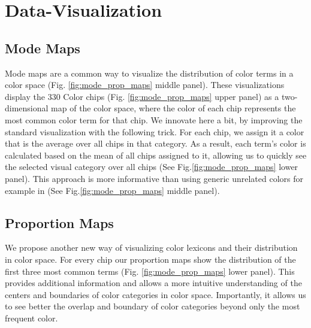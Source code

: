 \section{Data-Visualization}

\subsection{Mode Maps}

Mode maps are a common way to visualize the distribution of color terms in a color space (Fig. \ref{fig:mode_prop_maps} middle panel).
These visualizations display the 330 Color chips (Fig. \ref{fig:mode_prop_maps} upper panel) as a two-dimensional map of the color space, where the color of each chip represents the most common color term for that chip.
We innovate here a bit, by improving the standard visualization with the following trick. 
 For each chip, we assign it a color that is the average over all chips in that category.
 As a result, each term's color is calculated based on the mean of all chips assigned to it, allowing us to quickly see the selected visual category over all chips (See Fig.\ref{fig:mode_prop_maps} lower panel).
This approach is more informative than using generic unrelated colors for example in \cite{regierColor2007} (See Fig.\ref{fig:mode_prop_maps} middle panel). 



\subsection{Proportion Maps}
We propose another new way of visualizing color lexicons and their distribution in color space.
For every chip our proportion maps show the distribution of the first three most common terms (Fig. \ref{fig:mode_prop_maps} lower panel).
This provides additional information and allows a more intuitive understanding of the centers and boundaries of color categories in color space. Importantly, it allows us to see better the overlap and boundary of color categories beyond only the most frequent color. 

